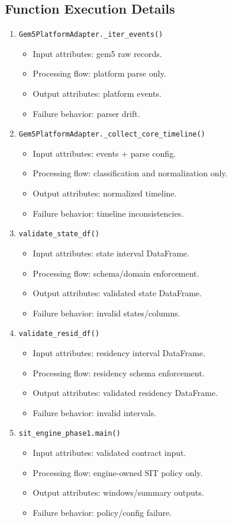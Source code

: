 \documentclass[11pt,a4paper]{article}
\begin{document}
\subsection*{Function Execution Details}
\begin{enumerate}[leftmargin=*]
  \item \texttt{Gem5PlatformAdapter.\_iter\_events()}
  \begin{itemize}[leftmargin=*]
    \item Input attributes: gem5 raw records.
    \item Processing flow: platform parse only.
    \item Output attributes: platform events.
    \item Failure behavior: parser drift.
  \end{itemize}
  \item \texttt{Gem5PlatformAdapter.\_collect\_core\_timeline()}
  \begin{itemize}[leftmargin=*]
    \item Input attributes: events + parse config.
    \item Processing flow: classification and normalization only.
    \item Output attributes: normalized timeline.
    \item Failure behavior: timeline inconsistencies.
  \end{itemize}
  \item \texttt{validate\_state\_df()}
  \begin{itemize}[leftmargin=*]
    \item Input attributes: state interval DataFrame.
    \item Processing flow: schema/domain enforcement.
    \item Output attributes: validated state DataFrame.
    \item Failure behavior: invalid states/columns.
  \end{itemize}
  \item \texttt{validate\_resid\_df()}
  \begin{itemize}[leftmargin=*]
    \item Input attributes: residency interval DataFrame.
    \item Processing flow: residency schema enforcement.
    \item Output attributes: validated residency DataFrame.
    \item Failure behavior: invalid intervals.
  \end{itemize}
  \item \texttt{sit\_engine\_phase1.main()}
  \begin{itemize}[leftmargin=*]
    \item Input attributes: validated contract input.
    \item Processing flow: engine-owned SIT policy only.
    \item Output attributes: windows/summary outputs.
    \item Failure behavior: policy/config failure.
  \end{itemize}
\end{enumerate}
\end{document}
